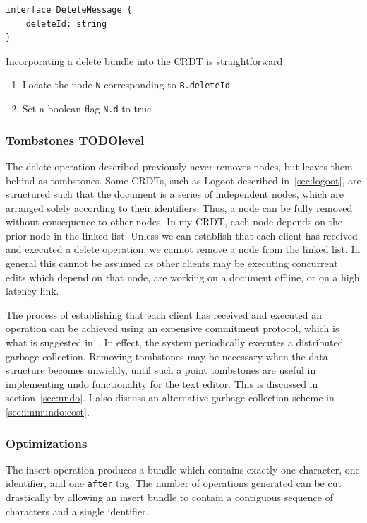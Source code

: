 \documentclass[12pt,a4paper,twoside,openright]{report}
\begin{document}
\vspace{3mm}
\begin{lstlisting}[caption=Delete Bundle Type Signature]
interface DeleteMessage {
    deleteId: string
}
\end{lstlisting}				
				
				Incorporating a delete bundle into the CRDT is straightforward
				\begin{enumerate}
					\item Locate the node \texttt{N} corresponding to \texttt{B.deleteId}
					\item Set a boolean flag \texttt{N.d} to true
				\end{enumerate}
				
		\subsubsection{Tombstones TODOlevel}
			The delete operation described previously never removes nodes, but leaves them behind as tombstones. Some CRDTs, such as Logoot described in~\cref{sec:logoot}, are structured such that the document is a series of independent nodes, which are arranged solely according to their identifiers. Thus, a node can be fully removed without consequence to other nodes. In my CRDT, each node depends on the prior node in the linked list. Unless we can establish that each client has received and executed a delete operation, we cannot remove a node from the linked list. In general this cannot be assumed as other clients may be executing concurrent edits which depend on that node, are working on a document offline, or on a high latency link.
			
			The process of establishing that each client has received and executed an operation can be achieved using an expensive commitment protocol, which is what is suggested in~\cite{preguica2009}. In effect, the system periodically executes a distributed garbage collection. Removing tombstones may be necessary when the data structure becomes unwieldy, until such a point tombstones are useful in implementing undo functionality for the text editor. This is discussed in section~\cref{sec:undo}. I also discuss an alternative garbage collection scheme in \cref{sec:immundo:cost}.
			
		
		\subsubsection{Optimizations}
			The insert operation produces a bundle which contains exactly one character, one identifier, and one \texttt{after} tag. The number of operations generated can be cut drastically by allowing an insert bundle to contain a contiguous sequence of characters and a single identifier.
			
\end{document}
